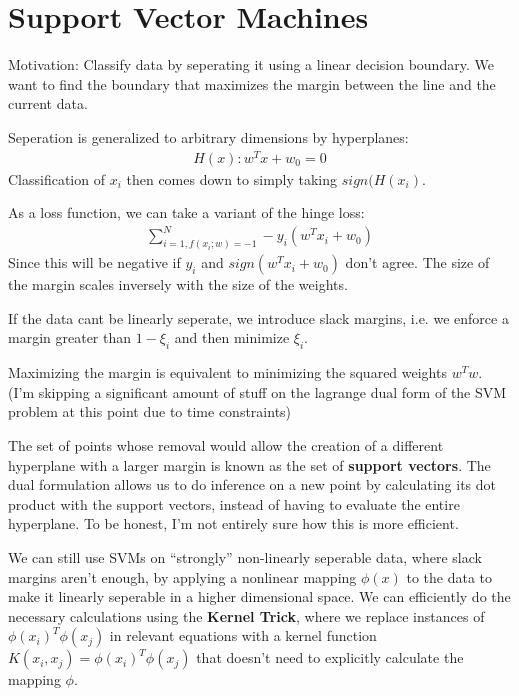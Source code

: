 \documentclass{report}
\newcommand{\tbf}{\textbf}
\newcommand*{\newpar}{\par\vspace{\baselineskip}\noindent}
\begin{document}
\chapter{Support Vector Machines}
Motivation: Classify data by seperating it using a linear decision boundary. We want to find the boundary that maximizes the margin between the line and the current data.
\newpar
Seperation is generalized to arbitrary dimensions by hyperplanes:
\begin{align}
 H(x): w^T x + w_0 = 0
\end{align}
Classification of $x_i$ then comes down to simply taking $sign(H(x_i)$.
\newpar
As a loss function, we can take a variant of the hinge loss:
\begin{align}
 \sum_{i=1,f(x_i;w) = -1}^N -y_i(w^Tx_i + w_0)
\end{align}
Since this will be negative if $y_i$ and $sign(w^Tx_i + w_0)$ don't agree.
The size of the margin scales inversely with the size of the weights.
\newpar
If the data cant be linearly seperate, we introduce slack margins, i.e. we enforce a margin greater than $1 - \xi_i$ and then minimize $\xi_i$.
\newpar
Maximizing the margin is equivalent to minimizing the squared weights $w^T w$. (I'm skipping a significant amount of stuff on the lagrange dual form of the SVM problem  at this point due to time constraints)
\newpar
The set of points whose removal would allow the creation of a different hyperplane with a larger margin is known as the set of \tbf{support vectors}. The dual formulation allows us to do inference on a new point by calculating its dot product with the support vectors, instead of having to evaluate the entire hyperplane. To be honest, I'm not entirely sure how this is more efficient.
\newpar
We can still use SVMs on ``strongly'' non-linearly seperable data, where slack margins aren't enough, by applying a nonlinear mapping $\phi(x)$ to the data to make it linearly seperable in a higher dimensional space. We can efficiently do the necessary calculations using the \tbf{Kernel Trick}, where we replace instances of $\phi(x_i)^T \phi(x_j)$ in relevant equations with a kernel function $K(x_i,x_j) = \phi(x_i)^T \phi(x_j)$ that doesn't need to explicitly calculate the mapping $\phi$.
%
\end{document}
